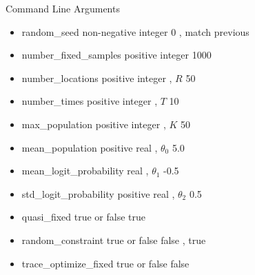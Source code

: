 \documentclass{beamer}
\begin{document}
\begin{frame}{Command Line Arguments}
\fontsize{10}{11}\selectfont
\begin{itemize}

\item
random\_seed
\hspace{4em} non-negative integer
\hspace{0em} 0 , match previous
\pause

\item
number\_fixed\_samples
\hspace{0.2em} positive integer
\hspace{2.1em} 1000
\pause

\item
number\_locations
\hspace{2.0em} positive integer , $R$
\hspace{0.6em} 50
\pause

\item
number\_times
\hspace{3.5em} positive integer , $T$
\hspace{0.5em} 10
\pause

\item
max\_population
\hspace{2.7em} positive integer , $K$
\hspace{0.5em} 50
\pause

\item
mean\_population
\hspace{2.2em} positive real , $\theta_0$
\hspace{1.8em} 5.0
\pause

\item
mean\_logit\_probability
\hspace{0em} real , $\theta_1$
\hspace{5.1em} -0.5
\pause

\item
std\_logit\_probability
\hspace{1em} positive real , $\theta_2$
\hspace{1.9em} 0.5
\pause

\item
quasi\_fixed
\hspace{4.8em} true or false
\hspace{3.8em} true
\pause

\item
random\_constraint
\hspace{1.6em} true or false
\hspace{3.8em} false , true
\pause

\item
trace\_optimize\_fixed
\hspace{1em} true or false
\hspace{3.8em} false
\pause

\end{itemize}
\end{frame}
\end{document}
